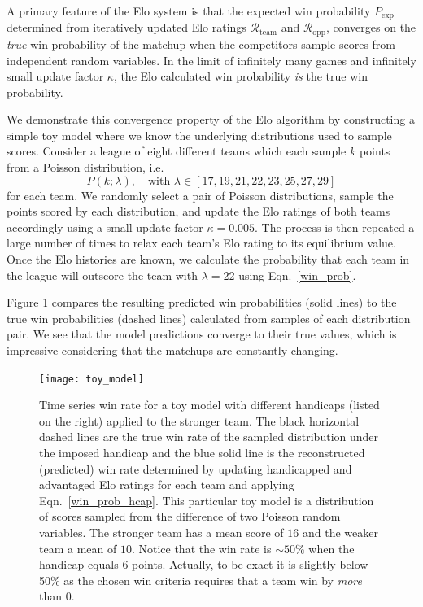 \documentclass[aps,prc,reprint,amsmath,superscriptaddress]{revtex4-1}
\newcommand{\R}{\mathcal{R}}
\begin{document}
A primary feature of the Elo system is that the expected win probability $P_\text{exp}$ determined from iteratively updated Elo ratings $\R_\text{team}$ and $\R_\text{opp}$, converges on the \emph{true} win probability of the matchup when the competitors sample scores from independent random variables.
In the limit of infinitely many games and infinitely small update factor $\kappa$, the Elo calculated win probability \emph{is} the true win probability.

We demonstrate this convergence property of the Elo algorithm by constructing a simple toy model where we know the underlying distributions used to sample scores.
Consider a league of eight different teams which each sample $k$ points from a Poisson distribution, i.e.\
\begin{equation}
  P(k; \lambda), \quad \text{with } \lambda \in [17, 19, 21, 22, 23, 25, 27, 29]
\end{equation}
for each team.
We randomly select a pair of Poisson distributions, sample the points scored by each distribution, and update the Elo ratings of both teams accordingly using a small update factor $\kappa = 0.005$.
The process is then repeated a large number of times to relax each team's Elo rating to its equilibrium value.
Once the Elo histories are known, we calculate the probability that each team in the league will outscore the team with $\lambda=22$ using Eqn.~\eqref{win_prob}.

Figure \ref{fig:toy_model} compares the resulting predicted win probabilities (solid lines) to the true win probabilities (dashed lines) calculated from samples of each distribution pair.
We see that the model predictions converge to their true values, which is impressive considering that the matchups are constantly changing.

\begin{figure}
  \texttt{[image: toy\_model]}
  \caption{\label{fig:toy_model} Time series win rate for a toy model with different handicaps (listed on the right) applied to the stronger team. The black horizontal dashed lines are the true win rate of the sampled distribution under the imposed handicap and the blue solid line is the reconstructed (predicted) win rate determined by updating handicapped and advantaged Elo ratings for each team and applying Eqn.~\eqref{win_prob_hcap}. This particular toy model is a distribution of scores sampled from the difference of two Poisson random variables. The stronger team has a mean score of $16$ and the weaker team a mean of $10$. Notice that the win rate is $\sim\!50\%$ when the handicap equals $6$ points. Actually, to be exact it is slightly below 50\% as the chosen win criteria requires that a team win by \emph{more} than 0.}
\end{figure}
\end{document}
